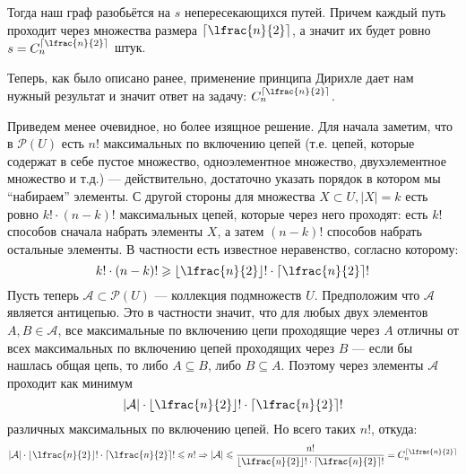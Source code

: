 \documentclass[a4paper,12pt,twoside]{article}
\begin{document}
\begin{solution}{}
    Тогда наш граф разобьётся на \(s\) непересекающихся путей. Причем каждый путь проходит через множества размера \(\ceil{\lfrac{n}{2}}\), а значит их будет ровно  \(s = C_{n}^{\ceil{\lfrac{n}{2}}}\) штук. 
    \begin{center}
    \end{center}

    Теперь, как было описано ранее, применение принципа Дирихле дает нам нужный результат и значит ответ на задачу: \(C_{n}^{\ceil{\lfrac{n}{2}}}\). 
    
    Приведем менее очевидное, но более изящное решение. Для начала заметим, что в \(\mathcal{P}(U)\) есть \(n!\) максимальных по включению цепей (т.е. цепей, которые содержат в себе пустое множество, одноэлементное множество, двухэлементное множество и т.д.) --- действительно, достаточно указать порядок в котором мы \enquote{набираем} элементы.  С другой стороны для множества \(X \subset U, |X| = k\) есть ровно \(k! \cdot (n - k)!\) максимальных цепей, которые через него проходят: есть \(k!\) способов сначала набрать элементы \(X\), а затем \((n - k)!\) способов набрать остальные элементы. В частности есть известное неравенство, согласно которому:
    \[
        k! \cdot (n - k)! \geq \floor{\lfrac{n}{2}}! \cdot \ceil{\lfrac{n}{2}}! 
    \]
    Пусть теперь \(\mathcal{A} \subset \mathcal{P}(U)\) --- коллекция подмножеств \(U\). Предположим что \(\mathcal{A}\) является антицепью. Это в частности значит, что для любых двух элементов \(A, B \in \mathcal{A}\), все максимальные по включению цепи проходящие через \(A\) отличны от всех максимальных по включению цепей проходящих через \(B\) --- если бы нашлась общая цепь, то либо \(A \subseteq B\), либо \(B \subseteq A\). Поэтому через элементы \(\mathcal{A}\) проходит как минимум
    \[
        |\mathcal{A}| \cdot \floor{\lfrac{n}{2}}! \cdot \ceil{\lfrac{n}{2}}! 
    \]
    различных максимальных по включению цепей. Но всего таких \(n!\), откуда:
    \[
    |\mathcal{A}| \cdot \floor{\lfrac{n}{2}}! \cdot \ceil{\lfrac{n}{2}}! \leq n! \Rightarrow |\mathcal{A}| \leq \frac{n!}{\floor{\lfrac{n}{2}}! \cdot \ceil{\lfrac{n}{2}}!} = C_{n}^{\ceil{\lfrac{n}{2}}}
    \]
\end{solution}
\end{document}
